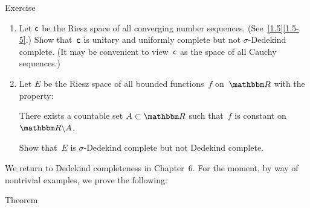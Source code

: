 \documentclass[main.tex]{subfiles}
\begin{document}
\begin{psec}{4.20}{Exercise}
\begin{enumerate}
\item \label{4.20-1}
Let $\mathsf{c}$ be the Riesz space of all converging number sequences.
(See~\ref{1.5}\ref{1.5-5}.)
Show that~$\mathsf{c}$ is unitary and uniformly complete
but not $\sigma$-Dedekind complete.
(It may be convenient to view~$\mathsf{c}$ as the space of all Cauchy sequences.)
%
\item \label{4.20-2}
Let $E$ be the Riesz space of all bounded functions~$f$ on~$\R$
with the property:
\begin{center}
\parbox{15em}{There exists a countable set $A\subset\R$
such that~$f$ is constant on $\R\backslash A$.}
\end{center}
Show that~$E$ is $\sigma$-Dedekind complete but not Dedekind complete.
\end{enumerate}
\end{psec}
%
%
We return to Dedekind completeness in Chapter~6. 
For the moment,
by way of nontrivial examples,
we prove the following:
\begin{psec}{4.21}{Theorem}\end{psec}
\end{document}
